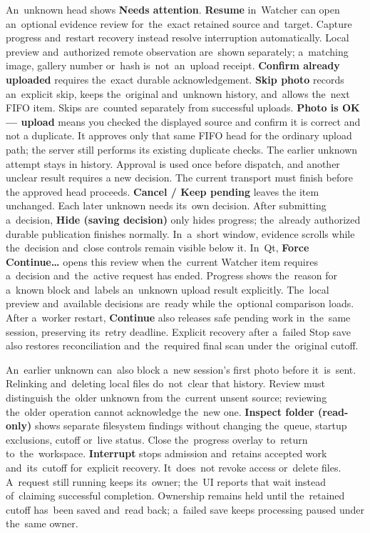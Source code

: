 \documentclass[11pt,a4paper]{article}
\newcommand{\ui}[1]{\textbf{#1}}
\begin{document}
An~unknown head shows \ui{Needs attention}. \ui{Resume} in~Watcher can open
an~optional evidence review for~the~exact retained source and~target. Capture
progress and~restart recovery instead resolve interruption automatically. Local preview
and~authorized remote observation are~shown separately; a~matching image,
gallery number or~hash is~not~an~upload receipt. \ui{Confirm already uploaded}
requires the~exact durable acknowledgement. \ui{Skip photo} records
an~explicit skip, keeps the~original and~unknown history, and~allows
the~next FIFO item. Skips are~counted separately from successful uploads.
\ui{Photo is OK — upload} means you checked the displayed source and confirm
it is correct and not a duplicate. It approves only that same FIFO head for
the ordinary upload path; the server still performs its existing duplicate
checks. The earlier unknown attempt stays in history. Approval is used once
before dispatch, and another unclear result requires a new decision. The
current transport must finish before the approved head proceeds.
\ui{Cancel / Keep pending} leaves the item unchanged. Each later unknown needs
its~own decision.
After submitting a~decision, \ui{Hide (saving decision)} only hides progress;
the~already authorized durable publication finishes normally.
In~a~short window, evidence scrolls while the~decision and~close controls
remain visible below it.
In~Qt, \ui{Force Continue…} opens this review when the~current Watcher
item requires a~decision and~the~active request has ended. Progress shows
the~reason for a~known block and~labels an~unknown upload result explicitly.
The~local preview and~available decisions are~ready while the~optional
comparison loads.
After a~worker restart, \ui{Continue} also releases safe pending
work in~the~same session, preserving its~retry deadline.
Explicit recovery after a~failed Stop save also restores reconciliation
and~the~required final scan under the~original cutoff.

An~earlier unknown can~also block a~new session's first photo before
it~is~sent. Relinking and~deleting local files do~not~clear that history.
Review must distinguish the~older unknown from the~current unsent source;
reviewing the~older operation cannot acknowledge the~new one.
\ui{Inspect folder (read-only)} shows separate filesystem findings without
changing the~queue, startup exclusions, cutoff or~live status.
Close the~progress overlay to~return to~the~workspace. \ui{Interrupt} stops admission
and~retains accepted work and~its~cutoff for~explicit recovery. It~does~not
revoke access or~delete files. A~request still running keeps its~owner;
the~UI reports that wait instead of~claiming successful completion.
Ownership remains held until the~retained cutoff has~been saved and~read back;
a~failed save keeps processing paused under the~same owner.
\end{document}
